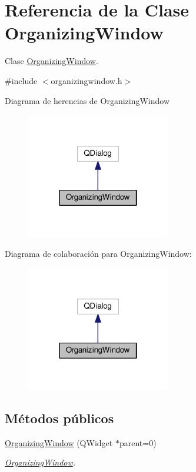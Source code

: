 \hypertarget{class_organizing_window}{}\section{Referencia de la Clase Organizing\+Window}
\label{class_organizing_window}


Clase \hyperlink{class_organizing_window}{Organizing\+Window}.  




{\ttfamily \#include $<$organizingwindow.\+h$>$}



Diagrama de herencias de Organizing\+Window\nopagebreak
\begin{figure}[H]
\begin{center}
\leavevmode
\includegraphics[width=178pt]{class_organizing_window__inherit__graph}
\end{center}
\end{figure}


Diagrama de colaboración para Organizing\+Window\+:\nopagebreak
\begin{figure}[H]
\begin{center}
\leavevmode
\includegraphics[width=178pt]{class_organizing_window__coll__graph}
\end{center}
\end{figure}
\subsection*{Métodos públicos}
\begin{DoxyCompactItemize}
\item 
\hyperlink{class_organizing_window_ae1cc436971abebbed7105b7f072576aa}{Organizing\+Window} (Q\+Widget $\ast$parent=0)
\begin{DoxyCompactList}\small\item\em \hyperlink{class_organizing_window}{Organizing\+Window}. \end{DoxyCompactList}\end{DoxyCompactItemize}


